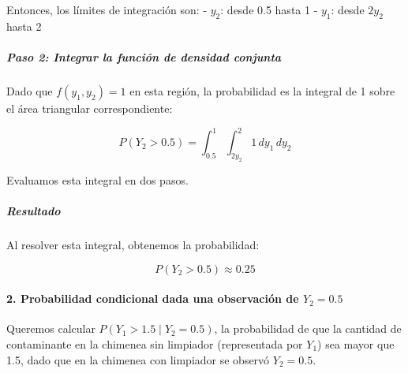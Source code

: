 \documentclass[
]{article}
\newenvironment{Shaded}{\begin{snugshade}}{\end{snugshade}}
\newcommand{\AttributeTok}[1]{\textcolor[rgb]{0.13,0.29,0.53}{#1}}
\newcommand{\ControlFlowTok}[1]{\textcolor[rgb]{0.13,0.29,0.53}{\textbf{#1}}}
\newcommand{\DecValTok}[1]{\textcolor[rgb]{0.00,0.00,0.81}{#1}}
\newcommand{\DocumentationTok}[1]{\textcolor[rgb]{0.56,0.35,0.01}{\textbf{\textit{#1}}}}
\newcommand{\FloatTok}[1]{\textcolor[rgb]{0.00,0.00,0.81}{#1}}
\newcommand{\FunctionTok}[1]{\textcolor[rgb]{0.13,0.29,0.53}{\textbf{#1}}}
\newcommand{\NormalTok}[1]{#1}
\newcommand{\OtherTok}[1]{\textcolor[rgb]{0.56,0.35,0.01}{#1}}
\newcommand{\SpecialCharTok}[1]{\textcolor[rgb]{0.81,0.36,0.00}{\textbf{#1}}}
\begin{document}
Entonces, los límites de integración son:
- \(y_2\): desde 0.5 hasta 1
- \(y_1\): desde \(2 y_2\) hasta 2

\subparagraph{Paso 2: Integrar la función de densidad conjunta}\label{paso-2-integrar-la-funciuxf3n-de-densidad-conjunta-1}

Dado que \(f(y_1, y_2) = 1\) en esta región, la probabilidad es la integral de 1 sobre el área triangular correspondiente:

\[
P(Y_2 > 0.5) = \int_{0.5}^{1} \int_{2 y_2}^{2} 1 \, dy_1 \, dy_2
\]

Evaluamos esta integral en dos pasos.

\begin{Shaded}
\end{Shaded}

\subparagraph{Resultado}\label{resultado-1}

Al resolver esta integral, obtenemos la probabilidad:

\[
P(Y_2 > 0.5) \approx 0.25
\]

\paragraph{\texorpdfstring{2. Probabilidad condicional dada una observación de \(Y_2 = 0.5\)}{2. Probabilidad condicional dada una observación de Y\_2 = 0.5}}\label{probabilidad-condicional-dada-una-observaciuxf3n-de-y_2-0.5-1}

Queremos calcular \(P(Y_1 > 1.5 \mid Y_2 = 0.5)\), la probabilidad de que la cantidad de contaminante en la chimenea sin limpiador (representada por \(Y_1\)) sea mayor que 1.5, dado que en la chimenea con limpiador se observó \(Y_2 = 0.5\).
\end{document}
